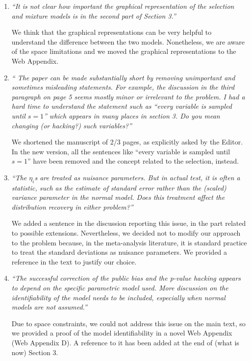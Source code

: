 \documentclass[11pt]{article}
\begin{document}
\begin{enumerate}
\item \emph{``It is not clear how important the graphical representation of the selection and mixture models is in the second part of Section 3.''}


We think that the graphical representations can be very helpful to understand the difference between the two models. Nonetheless, we are aware of the space limitations and we moved the graphical representations to the Web Appendix.


\item \emph{`` The paper can be made substantially short by removing unimportant and sometimes misleading statements. For example, the discussion in the third paragraph on page 5 seems mostly minor or irrelevant to the problem. I had a hard time to understand the statement such as ``every variable is sampled until $s = 1$'' which appears in many places in section 3. Do you mean changing (or hacking?) such variables?''}


We shortened the manuscript of 2/3 pages, as explicitly asked by the Editor. In the new version, all the sentences like ``every variable is sampled until $s = 1$'' have been removed and the concept related to the selection, instead.



\item \emph{``The $\eta_i$s are treated as nuisance parameters. But in actual test, it is often a statistic, such as the estimate of standard error rather than the (scaled) variance parameter in the normal model. Does this treatment affect the distribution recovery in either problem?''}

We added a sentence in the discussion reporting this issue, in the part related to possible extensions. Nevertheless, we decided not to modify our approach to the problem because, in the meta-analysis literature, it is standard practice to treat the standard deviations as nuisance parameters. We provided a reference in the text to justify our choice.

\item \emph{``The successful correction of the public bias and the p-value hacking appears to depend on the specific parametric model used. More discussion on the identifiability of the model needs to be included, especially when normal models are not assumed.''}

Due to space constraints, we could not address this issue on the main text, so we provided a proof of the model identifiability in a novel Web Appendix (Web Appendix D). A reference to it has been added at the end of (what is now) Section 3.
\end{enumerate}
\end{document}
